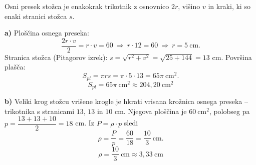\documentclass[a4paper,12pt]{letter}
\begin{document}
\newpage
\begin{resitev}[-- sto\v{z}ec]
Osni presek sto\v{z}ca je enakokrak trikotnik z osnovnico $2r$, vi\v{s}ino $v$ in kraki, ki so enaki stranici sto\v{z}ca $s$.

\textbf{a)} Plo\v{s}\v{c}ina osnega preseka:
\[
\frac{2r\cdot v}{2}=r\cdot v=60\ \Rightarrow\ r\cdot12=60\ \Rightarrow\ r=5\ \text{cm}.
\]
Stranica sto\v{z}ca (Pitagorov izrek): $s=\sqrt{r^2+v^2}=\sqrt{25+144}=13$ cm. Povr\v{s}ina pla\v{s}\v{c}a:
\[
S_{pl}=\pi rs=\pi\cdot5\cdot13=65\pi\ \text{cm}^2.
\]
\[
\boxed{S_{pl}=65\pi\ \text{cm}^2\approx204{,}20\ \text{cm}^2}
\]

\textbf{b)} Veliki krog sto\v{z}cu vri\v{s}ene krogle je hkrati vrisana kro\v{z}nica osnega preseka -- trikotnika s stranicami $13$, $13$ in $10$ cm. Njegova plo\v{s}\v{c}ina je $60\ \text{cm}^2$, polobseg pa $p=\dfrac{13+13+10}{2}=18$ cm. Iz $P=\rho\cdot p$ sledi
\[
\rho=\frac{P}{p}=\frac{60}{18}=\frac{10}{3}\ \text{cm}.
\]
\[
\boxed{\rho=\frac{10}{3}\ \text{cm}\approx3{,}33\ \text{cm}}
\]
\end{resitev}
\end{document}
